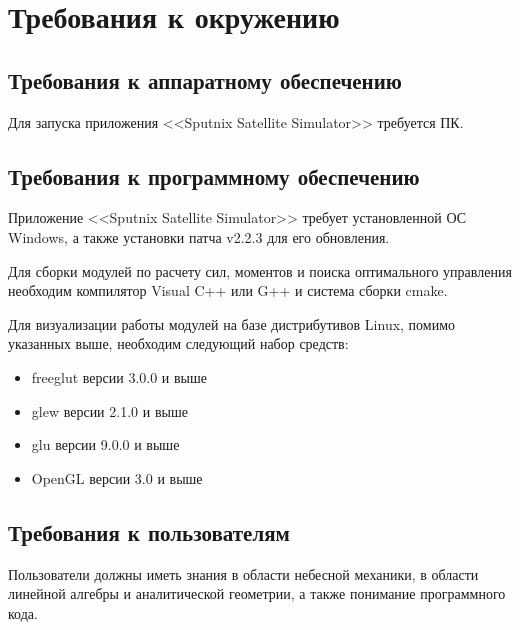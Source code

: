 \chapter{Требования к окружению}
\section{Требования к аппаратному обеспечению}
\noindent\indent Для запуска приложения <<Sputnix Satellite Simulator>> требуется
ПК.
\section{Требования к программному обеспечению}
\noindent\indent Приложение <<Sputnix Satellite Simulator>> требует установленной
ОС Windows, а также установки патча v2.2.3 для его обновления.\par
Для сборки модулей по расчету сил, моментов и поиска оптимального
управления необходим компилятор Visual C++ или G++ и система сборки cmake.\par
Для визуализации работы модулей на базе дистрибутивов Linux, помимо
указанных выше, необходим следующий набор средств:
\begin{itemize}
  \item freeglut версии 3.0.0 и выше
  \item glew версии 2.1.0 и выше
  \item glu версии 9.0.0 и выше
  \item OpenGL версии 3.0 и выше
\end{itemize}
\section{Требования к пользователям}
\noindent\indent Пользователи должны иметь знания в области небесной механики,
в области линейной алгебры и аналитической геометрии, а также понимание программного
кода.
